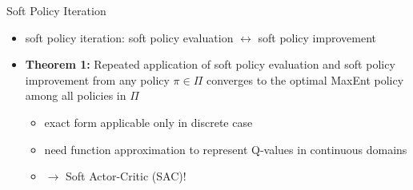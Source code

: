 \begin{frame}{Soft Policy Iteration}
\begin{itemize}
    \item soft policy iteration: soft policy evaluation $\longleftrightarrow$ soft policy improvement
    \vspace{0.5em}
    \item \textbf{Theorem 1:} Repeated application of soft policy evaluation and soft policy improvement from any policy $\pi \in \Pi$ converges to the optimal MaxEnt policy among all policies in $\Pi$
    \begin{itemize}
        \item exact form applicable only in discrete case
        \item need function approximation to represent Q-values in continuous domains
        \item $\to$ Soft Actor-Critic (SAC)!
    \end{itemize}
\end{itemize}
\end{frame}
